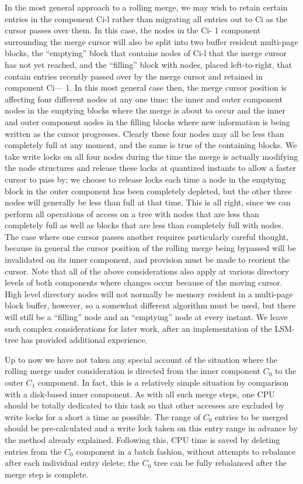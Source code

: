 \documentclass[a4paper,12pt,notitlepage,twoside,openright]{article}
\begin{document}
In the most general approach to a rolling merge, we may wish to retain
certain entries in the component Ci-l rather than migrating all entries
out to Ci as the cursor passes over them. In this case, the nodes in the
Ci- 1 component surrounding the merge cursor will also be split into two
buffer resident multi-page blocks, the ``emptying'' block that contains
nodes of Ci-l that the merge cursor has not yet reached, and the
``filling'' block with nodes, placed left-to-right, that contain entries
recently passed over by the merge cursor and retained in component Ci---
1. In this most general case then, the merge cursor position is
affecting four different nodes at any one time: the inner and outer
component nodes in the emptying blocks where the merge is about to occur
and the inner and outer component nodes in the filling blocks where new
information is being written as the cursor progresses. Clearly these
four nodes may all be less than completely full at any moment, and the
same is true of the containing blocks. We take write locks on all four
nodes during the time the merge is actually modifying the node
structures and release these locks at quantized instants to allow a
faster cursor to pass by; we choose to release locks each time a node in
the emptying block in the outer component has been completely depleted,
but the other three nodes will generally be less than full at that time.
This is all right, since we can perform all operations of access on a
tree with nodes that are less than completely full as well as blocks
that are less than completely full with nodes. The case where one cursor
passes another requires particularly careful thought, because in general
the cursor position of the rolling merge being bypassed will be
invalidated on its inner component, and provision must be made to
reorient the cursor. Note that all of the above considerations also
apply at various directory levels of both components where changes occur
because of the moving cursor. High level directory nodes will not
normally be memory resident in a multi-page block buffer, however, so a
somewhat different algorithm must be used, but there will still be a
``filling'' node and an ``emptying'' node at every instant. We leave such
complex considerations for later work, after an implementation of the
LSM-tree has provided additional experience.

Up to now we have not taken any special account of the situation where
the rolling merge under consideration is directed from the inner
component \(C_0\) to the outer \(C_1\) component. In fact, this is a relatively
simple situation by comparison with a disk-based inner component. As
with all such merge steps, one CPU should be totally dedicated to this
task so that other accesses are excluded by write locks for a short a
time as possible. The range of \(C_0\) entries to be merged should be
pre-calculated and a write lock taken on this entry range in advance by
the method already explained. Following this, CPU time is saved by
deleting entries from the \(C_0\) component in a batch fashion, without
attempts to rebalance after each individual entry delete; the \(C_0\) tree
can be fully rebalanced after the merge step is complete.
\end{document}
